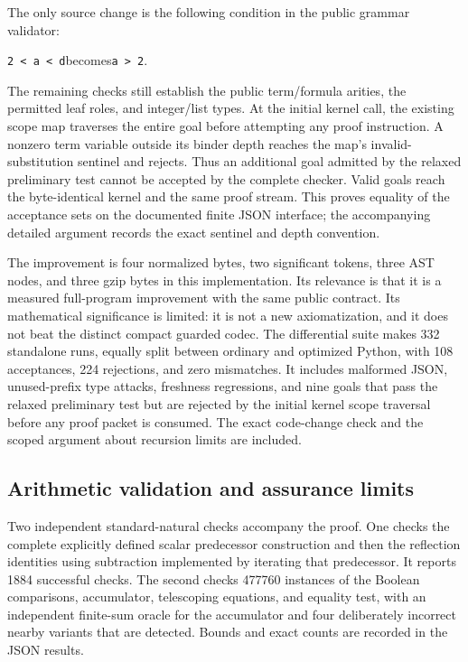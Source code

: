 \documentclass[11pt]{article}
\theoremstyle{definition}\newtheorem{definition}[theorem]{Definition}
\begin{document}
The only source change is the following condition in the public grammar
validator:
\begin{center}
\texttt{2 < a < d}\quad becomes\quad\texttt{a > 2}.
\end{center}
The remaining checks still establish the public term/formula arities,
the permitted leaf roles, and integer/list types.  At the initial kernel
call, the existing scope map traverses the entire goal before attempting
any proof instruction.  A nonzero term variable outside its binder depth
reaches the map's invalid-substitution sentinel and rejects.  Thus an
additional goal admitted by the relaxed preliminary test cannot be
accepted by the complete checker.  Valid goals reach the byte-identical
kernel and the same proof stream.  This proves equality of the acceptance
sets on the documented finite JSON interface; the accompanying detailed
argument records the exact sentinel and depth convention.

The improvement is four normalized bytes, two significant tokens, three
AST nodes, and three gzip bytes in this implementation.  Its relevance is
that it is a measured full-program improvement with the same public
contract.  Its mathematical significance is limited: it is not a new
axiomatization, and it does not beat the distinct compact guarded codec.
The differential suite makes 332 standalone runs, equally split between
ordinary and optimized Python, with 108 acceptances, 224 rejections, and
zero mismatches.  It includes malformed JSON, unused-prefix type attacks,
freshness regressions, and nine goals that pass the relaxed preliminary
test but are rejected by the initial kernel scope traversal before any
proof packet is consumed.  The exact code-change check and the scoped
argument about recursion limits are included.

\subsection{Arithmetic validation and assurance limits}
Two independent standard-natural checks accompany the proof.  One checks
the complete explicitly defined scalar predecessor construction and then
the reflection identities using subtraction implemented by iterating that
predecessor.  It reports 1884 successful checks.  The second checks 477760
instances of the Boolean comparisons, accumulator, telescoping equations,
and equality test, with an independent finite-sum oracle for the
accumulator and four deliberately incorrect nearby variants that are
detected.  Bounds and exact counts are recorded in the JSON results.
\end{document}
